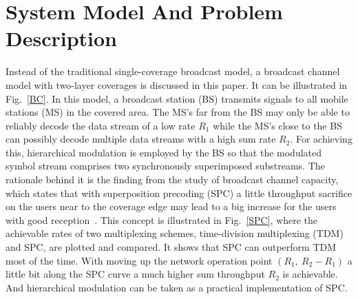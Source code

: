 \documentclass[conference]{IEEEtran}
\begin{document}
\section{System Model And Problem Description}
\begin{figure}
\end{figure}
Instead of the traditional single-coverage broadcast model, a
broadcast channel model with two-layer coverages is discussed in
this paper. It can be illustrated in Fig.~\ref{BC}. In this model,
a broadcast station (BS) transmits signals to all mobile stations
(MS) in the covered area. The MS's far from the BS may only be
able to reliably decode the data stream of a low rate $R_1$ while
the MS's close to the BS can possibly decode multiple data streams
with a high sum rate $R_2$. For achieving this, hierarchical
modulation is employed by the BS so that the modulated symbol
stream comprises two synchronously superimposed substreams. The
rationale behind it is the finding from the study of broadcast
channel capacity, which states that with superposition precoding
(SPC) a little throughput sacrifice on the users near to the
coverage edge may lead to a big increase for the users with good
reception~\cite{Cover72}. This concept is illustrated in
Fig.~\ref{SPC}, where the achievable rates of two multiplexing
schemes, time-division multiplexing (TDM) and SPC, are plotted and
compared. It shows that SPC can outperform TDM most of the time.
With moving up the network operation point $(R_1,\ R_{2}-R_{1})$ a
little bit along the SPC curve a much higher sum throughput
$R_{2}$ is achievable. And hierarchical modulation can be taken as
a practical implementation of SPC.
\begin{figure}
\end{figure}
\end{document}
